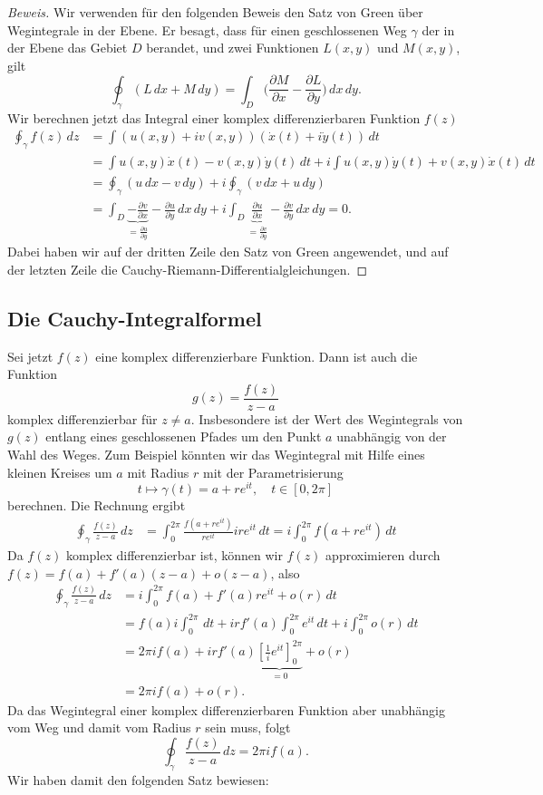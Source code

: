 \begin{proof}[Beweis]
Wir verwenden für den folgenden Beweis den Satz von Green über
%
Wegintegrale in der Ebene.
Er besagt, dass für einen geschlossenen Weg $\gamma$ der in der Ebene
das Gebiet $D$ berandet, und zwei Funktionen $L(x,y)$ und $M(x,y)$, gilt
\[
\oint_\gamma(L\,dx + M\,dy)
=
\int_D \biggl(\frac{\partial M}{\partial x}
-\frac{\partial L}{\partial y}\biggr)\,dx\,dy.
\]
Wir berechnen jetzt das Integral einer komplex differenzierbaren Funktion
$f(z)$
\begin{align*}
\oint_\gamma f(z)\,dz
&=
\int (u(x,y)+iv(x,y))(\dot x(t)+i\dot y(t))\,dt
\\
&=
\int u(x,y)\dot x(t) -v(x,y)\dot y(t)\,dt
+
i \int u(x,y)\dot y(t)+v(x,y)\dot x(t)\,dt
\\
&=\oint_\gamma(u\,dx - v\,dy) + i\oint_\gamma(v\,dx + u\,dy)
\\
&=
\int_D
\underbrace{-\frac{\partial v}{\partial x}}_{\displaystyle=\frac{\partial u}{\partial y}}
-\frac{\partial u}{\partial y}
\,dx\,dy
+i
\int_D
\underbrace{\frac{\partial u}{\partial x}}_{\displaystyle=\frac{\partial v}{\partial y}}
-\frac{\partial v}{\partial y}\,dx\,dy
=0.
\end{align*}
Dabei haben wir auf der dritten Zeile den Satz von Green angewendet,
und auf der letzten Zeile die Cauchy-Riemann-Differentialgleichungen.
\end{proof}

\subsection{Die Cauchy-Integralformel}
%
Sei jetzt $f(z)$ eine komplex differenzierbare Funktion.
Dann ist auch die Funktion
\[
g(z)=\frac{f(z)}{z-a}
\]
komplex differenzierbar für $z\ne a$.
Insbesondere ist der Wert des Wegintegrals von $g(z)$ entlang
eines geschlossenen Pfades um den Punkt $a$ unabhängig von der Wahl
des Weges.
Zum Beispiel könnten wir das Wegintegral mit Hilfe eines kleinen Kreises
um $a$ mit Radius $r$ mit der Parametrisierung
\[
t\mapsto \gamma(t)=a+re^{it},\quad t\in[0,2\pi]
\]
berechnen.
Die Rechnung ergibt
\begin{align*}
\oint_\gamma \frac{f(z)}{z-a}\,dz
&=
\int_0^{2\pi} \frac{f(a+re^{it})}{re^{it}}ire^{it}\,dt
=
i\int_0^{2\pi} f(a+re^{it})\,dt
\end{align*}
Da $f(z)$ komplex differenzierbar ist, können wir $f(z)$ approximieren
durch $f(z)=f(a)+f'(a)(z-a)+o(z-a)$, also
\begin{align*}
\oint_{\gamma} \frac{f(z)}{z-a}\,dz
&=
i\int_0^{2\pi}f(a) + f'(a)re^{it}+o(r)\,dt
\\
&=
f(a)i\int_0^{2\pi}\,dt
+ irf'(a)\int_0^{2\pi} e^{it}\,dt + i\int_0^{2\pi}o(r)\,dt
\\
&=
2\pi i f(a) + irf'(a)\underbrace{\left[\frac1{i}e^{it}\right]_0^{2\pi}}_{\displaystyle=0}+o(r)
\\
&=2\pi i f(a)+o(r).
\end{align*}
Da das Wegintegral einer komplex differenzierbaren Funktion aber unabhängig
vom Weg und damit vom Radius $r$ sein muss, folgt
\[
\oint_\gamma \frac{f(z)}{z-a}\,dz=2\pi i f(a).
\]
Wir haben damit den folgenden Satz bewiesen:


